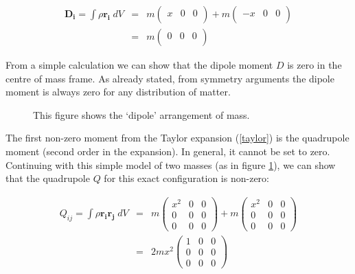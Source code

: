 \begin{eqnarray}
\mathbf{D_i} = \int \rho \mathbf{r_i} \;dV &=& m\left(\begin{array}{ccc}
x & 0 & 0 \\
\end{array}\right)
+ m\left(\begin{array}{ccc}
-x & 0 & 0 \\
\end{array}\right) \\
&=& m \left(\begin{array}{ccc}
0 & 0 & 0 \\
\end{array}\right)
\end{eqnarray}

From a simple calculation we can show that the dipole moment $D$ is zero in the centre of mass frame. As already stated, from symmetry arguments the dipole moment is always zero for any distribution of matter.

\begin{figure}[htb]
   \begin{center}
     \leavevmode
                \epsfxsize=80mm

   \end{center}
\caption{This figure shows the `dipole' arrangement of mass.}
\label{fig.dipole}
\end{figure} 

\noindent The first non-zero moment from the Taylor expansion (\ref{taylor}) is the quadrupole moment (second order in the expansion). In general, it cannot be set to zero. Continuing with this simple model of two masses (as in figure \ref{fig.dipole}), we can show that the quadrupole $Q$ for this exact configuration is non-zero:

\begin{eqnarray}
Q_{ij} = \int \rho \mathbf{r_i} \mathbf{r_j}\;dV &=& m\left(\begin{array}{ccc}
x^2 & 0 & 0 \\
0 & 0 & 0 \\
0 & 0 & 0
\end{array}\right)
+ m\left(\begin{array}{ccc}
x^2 & 0 & 0 \\
0 & 0 & 0 \\
0 & 0 & 0
\end{array}\right) \\
&=&  2m x^2\left(\begin{array}{ccc}
1 & 0 & 0 \\
0 & 0 & 0 \\
0 & 0 & 0
\end{array}\right)
\end{eqnarray}

